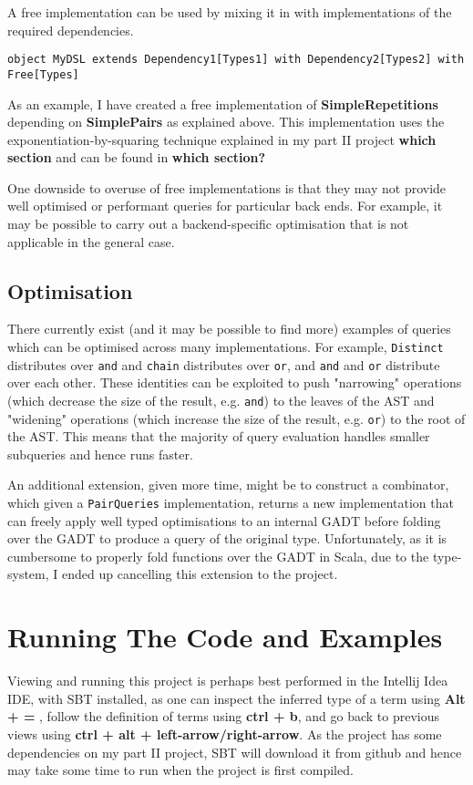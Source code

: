 \documentclass{report}
\newcommand \2[0]{\textbf{2}}
\newcommand \3[0]{\textbf{3}}
\newcommand{\todo}[1]{\textbf{#1}}
\begin{document}
A free implementation can be used by mixing it in with implementations of the required dependencies.

\begin{verbatim}
object MyDSL extends Dependency1[Types1] with Dependency2[Types2] with Free[Types]
\end{verbatim}

As an example, I have created a free implementation of \todo{SimpleRepetitions} depending on \todo{SimplePairs} as explained above. This  implementation uses the exponentiation-by-squaring technique explained in my part II project \todo{which section} and can be found in \todo{which section?}

One downside to overuse of free implementations is that they may not provide well optimised or performant queries for particular back ends. For example, it may be possible to carry out a backend-specific optimisation that is not applicable in the general case.

\section{Optimisation}
There currently exist (and it may be possible to find more) examples of queries which can be optimised across many implementations. For example, \texttt{Distinct} distributes over \texttt{and} and \texttt{chain} distributes over \texttt{or}, and \texttt{and} and \texttt{or} distribute over each other. These identities can be exploited to push "narrowing" operations (which decrease the size of the result, e.g. \texttt{and}) to the leaves of the AST and "widening" operations (which increase the size of the result, e.g. \texttt{or}) to the root of the AST. This means that the majority of query evaluation handles smaller subqueries and hence runs faster.

An additional extension, given more time, might be to construct a combinator, which given a \texttt{PairQueries} implementation, returns a new implementation that can freely apply well typed optimisations to an internal GADT before folding over the GADT to produce a query of the original type. Unfortunately, as it is cumbersome to properly fold functions over the GADT in Scala, due to the type-system, I ended up cancelling this extension to the project.

\chapter{Running The Code and Examples}
Viewing and running this project is perhaps best performed in the Intellij Idea IDE, with SBT installed, as one can inspect the inferred type of a term using \todo{Alt + = }, follow the definition of terms using \todo{ctrl + b}, and go back to previous views using \todo{ctrl + alt + left-arrow/right-arrow}.
As the project has some dependencies on my part II project, SBT will download it from github and hence may take some time to run when the project is first compiled.
\end{document}
